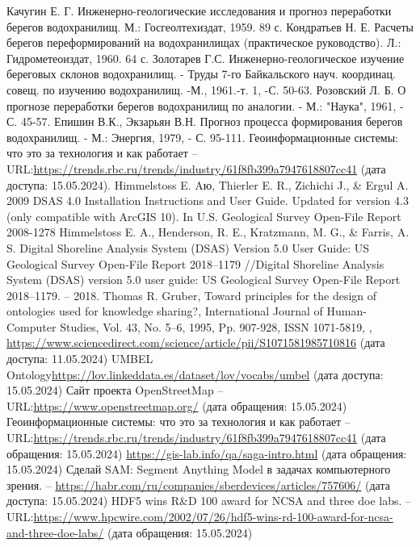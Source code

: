 \documentclass[732,fontsize=14pt,final]{studrep}
\begin{document}
\begin{thebibliography}{99}
Качугин Е. Г. Инженерно-геологические исследования и прогноз переработки берегов водохранилищ. М.: Госгеолтехиздат, 1959. 89 с.
Кондратьев Н. Е. Расчеты берегов переформирований на водохранилищах (практическое руководство). Л.: Гидрометеоиздат, 1960. 64 с.
Золотарев Г.С. Инженерно-геологическое изучение береговых склонов водохранилищ. - Труды 7-го Байкальского науч. координац. совещ. по изучению водохранилищ. -М., 1961.-т. 1, -С. 50-63.
Розовский Л. Б. О прогнозе переработки берегов водохранилищ по аналогии. - М.: "Наука", 1961, - С. 45-57.
Епишин В.К., Экзарьян В.Н. Прогноз процесса формирования берегов водохранилищ. - М.: Энергия, 1979, - С. 95-111.
 Геоинформационные системы: что это за технология и как работает -- URL:\url{https://trends.rbc.ru/trends/industry/61f8fb399a7947618807cc41} (дата доступа: 15.05.2024).
 Himmelstoss E. Aю, Thierler E. R., Zichichi J., \& Ergul A. 2009 DSAS 4.0 Installation Instructions and User Guide. Updated for version 4.3 (only compatible with ArcGIS 10). In U.S. Geological Survey Open-File Report 2008-1278
 Himmelstoss E. A., Henderson, R. E., Kratzmann, M. G., \& Farris, A. S. Digital Shoreline Analysis System (DSAS) Version 5.0 User Guide: US Geological Survey Open-File Report 2018–1179 //Digital Shoreline Analysis System (DSAS) version 5.0 user guide: US Geological Survey Open-File Report 2018–1179. – 2018.
 Thomas R. Gruber,
Toward principles for the design of ontologies used for knowledge sharing?,
International Journal of Human-Computer Studies,
Vol. 43, No. 5–6,
1995,
Pp. 907-928,
ISSN 1071-5819,
, \url{https://www.sciencedirect.com/science/article/pii/S1071581985710816} (дата доступа: 11.05.2024)
 UMBEL Ontology\url{https://lov.linkeddata.es/dataset/lov/vocabs/umbel} (дата доступа: 15.05.2024)
 Сайт проекта OpenStreetMap -- URL:\url{https://www.openstreetmap.org/} (дата обращения: 15.05.2024)
 Геоинформационные системы: что это за технология и как работает -- URL:\url{https://trends.rbc.ru/trends/industry/61f8fb399a7947618807cc41} (дата обращения: 15.05.2024)
\url{https://gis-lab.info/qa/saga-intro.html} (дата обращения: 15.05.2024)
 Сделай SAM: Segment Anything Model в задачах компьютерного зрения. -- \url{https://habr.com/ru/companies/sberdevices/articles/757606/} (дата доступа: 15.05.2024)
 HDF5 wins R\&D 100 award for NCSA and three doe labs. -- URL:\url{https://www.hpcwire.com/2002/07/26/hdf5-wins-rd-100-award-for-ncsa-and-three-doe-labs/} (дата обращения: 15.05.2024)


\end{thebibliography}
\end{document}
